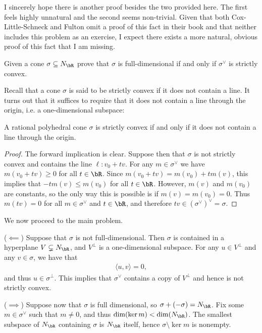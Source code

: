 \begin{homework}[e]
\begin{prf}
		I sincerely hope there is another proof besides the two provided here. The first feels highly unnatural and the second seems non-trivial. Given that both Cox-Little-Schneck and Fulton omit a proof of this fact in their book and that neither includes this problem as an exercise, I expect there exists a more natural, obvious proof of this fact that I am missing.
	\end{prf}
	\prob Given a cone $\sigma \subseteq N_\bR$ prove that $\sigma$ is full-dimensional if and only if $\sigma^{\vee}$ is strictly convex.
	\begin{prf}
		Recall that a cone $\sigma$ is said to be strictly convex if it does not contain a line. It turns out that it suffices to require that it does not contain a line through the origin, i.e. a one-dimensional subspace:
		 \begin{lem}\label{lem:strictly-convex-no-line-through-origin}
			A rational polyhedral cone $\sigma$ is strictly convex if and only if it does not contain a line through the origin.
		\end{lem}
        \begin{proof}
        	The forward implication is clear. Suppose then that $\sigma$ is not strictly convex and contains the line $\ell: v_0 + tv$. For any  $m \in \sigma^\vee$ we have $m(v_0 + tv) \geq 0$ for all $t \in \bR$. Since $m(v_0 + tv) = m(v_0)+tm(v)$, this implies that $-tm(v) \leq m(v_0)$ for all $t \in \bR$. However, $m(v)$ and $m(v_0)$ are constants, so the only way this is possible is if $m(v) = m(v_0) = 0$. Thus $m(tv) = 0$ for all $m \in \sigma^\vee$ and $t \in \bR$, and therefore $tv \in \left(\sigma^\vee\right)^\vee = \sigma$. 
        \end{proof}

		\noindent We now proceed to the main problem.

		($\impliedby$) Suppose that $\sigma$ is not full-dimensional. Then $\sigma$ is contained in a hyperplane $V\subsetneq N_\bR$, and $V^{\perp}$ is a one-dimensional subspace. For any $u \in V^{\perp}$ and any $v \in \sigma$, we have that
		\begin{align*}
			\langle u,v\rangle = 0,
		\end{align*}
		and thus $u \in \sigma^\perp$. This implies that $\sigma^\vee$ contains a copy of $V^\perp$ and hence is not strictly convex. 

		\bigskip

		($\implies$) Suppose now that $\sigma$ is full dimensional, so $\sigma + (-\sigma) = N_\bR$. Fix some $m\in \sigma^\vee$ such that $m \neq 0$, and thus $\dim(\ker m) < \dim(N_\bR)$. The smallest subspace of $N_\bR$ containing $\sigma$ is $N_\bR$ itself, hence $\sigma \setminus \ker m$ is nonempty. 


\end{prf}
\end{homework}
